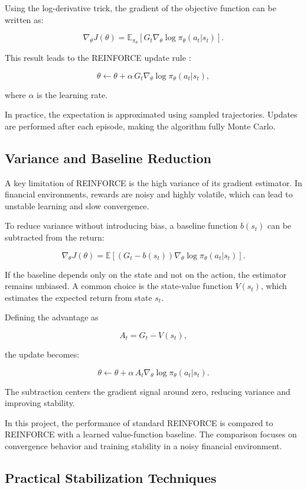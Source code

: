 Using the log-derivative trick, the gradient of the objective function can be written as:

\[
\nabla_\theta J(\theta) =
\mathbb{E}_{\pi_\theta}
\left[
G_t \nabla_\theta \log \pi_\theta(a_t|s_t)
\right].
\]

This result leads to the REINFORCE update rule \citep{williams1992simple}:

\[
\theta \leftarrow \theta 
+ \alpha \, G_t \nabla_\theta \log \pi_\theta(a_t|s_t),
\]

where $\alpha$ is the learning rate.

In practice, the expectation is approximated using sampled trajectories. 
Updates are performed after each episode, making the algorithm fully Monte Carlo.

\subsection{Variance and Baseline Reduction}

A key limitation of REINFORCE is the high variance of its gradient estimator. 
In financial environments, rewards are noisy and highly volatile, which can 
lead to unstable learning and slow convergence.

To reduce variance without introducing bias, a baseline function $b(s_t)$ 
can be subtracted from the return:

\[
\nabla_\theta J(\theta)
=
\mathbb{E}
\left[
(G_t - b(s_t)) \nabla_\theta \log \pi_\theta(a_t|s_t)
\right].
\]

If the baseline depends only on the state and not on the action, 
the estimator remains unbiased. A common choice is the state-value function 
$V(s_t)$, which estimates the expected return from state $s_t$.

Defining the advantage as

\[
A_t = G_t - V(s_t),
\]

the update becomes:

\[
\theta \leftarrow \theta 
+ \alpha \, A_t \nabla_\theta \log \pi_\theta(a_t|s_t).
\]

The subtraction centers the gradient signal around zero, 
reducing variance and improving stability. 

In this project, the performance of standard REINFORCE 
is compared to REINFORCE with a learned value-function baseline. 
The comparison focuses on convergence behavior and training stability 
in a noisy financial environment.


\subsection{Practical Stabilization Techniques}
\label{sec:stabilization}

